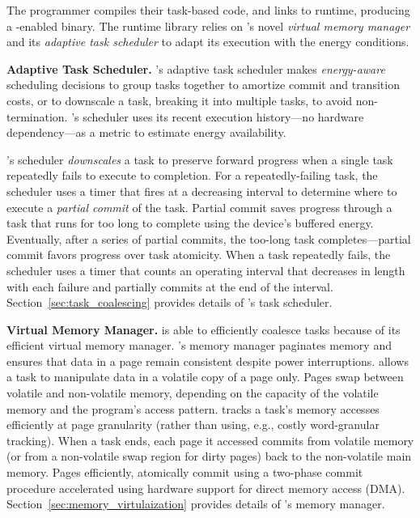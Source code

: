 The programmer compiles their task-based code, and links to \sys runtime,
producing a \sys-enabled binary. The runtime library relies on \sys's novel
{\em virtual memory manager} and its {\em adaptive task scheduler} to adapt its execution with the energy conditions.

\textbf{Adaptive Task Scheduler.} 
\sys's adaptive task scheduler makes \emph{energy-aware} scheduling decisions to group tasks together to amortize commit and transition costs, or to downscale a task, breaking it into multiple tasks, to avoid non-termination. \sys's scheduler uses its recent execution history---no hardware dependency---as a metric to estimate energy availability. 


\sys's scheduler {\em downscales} a task to preserve forward progress when a
single task repeatedly fails to execute to completion.  For a repeatedly-failing
task, the scheduler uses a timer that fires at a decreasing interval to
determine where to execute a {\em partial commit} of the task. Partial
commit saves progress through a task that runs for too long to complete
using the device's buffered energy. Eventually, after a series of partial
commits, the too-long task completes---partial commit favors progress over task atomicity.  
When a task repeatedly fails, the scheduler uses a timer that counts an operating interval
that decreases in length with each failure and \sys partially commits at the end of the interval. 
Section~\ref{sec:task_coalescing} provides details of \sys's task scheduler.

\textbf{Virtual Memory Manager.} \sys is able to efficiently coalesce
tasks because of its efficient virtual memory manager. \sys's memory manager
paginates memory and ensures that data in a page remain consistent despite
power interruptions. \sys allows a task to manipulate data in a volatile copy
of a page only. Pages swap between volatile and non-volatile memory, depending
on the capacity of the volatile memory and the program's access pattern. \sys
tracks a task's memory accesses efficiently at page granularity (rather than
using, e.g., costly word-granular tracking). When a task ends, each page it
accessed commits from volatile memory (or from a non-volatile swap region for
dirty pages) back to the non-volatile main memory. Pages efficiently,
atomically commit using a two-phase commit procedure accelerated using hardware
support for direct memory access (DMA). Section~\ref{sec:memory_virtulaization}
provides details of \sys's memory manager.
